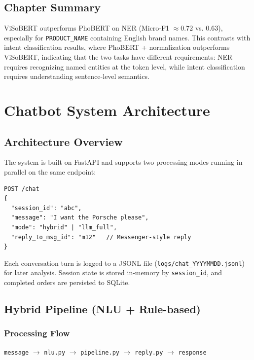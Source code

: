\documentclass[12pt, a4paper]{report}
\begin{document}
\section{Chapter Summary}

ViSoBERT outperforms PhoBERT on NER (Micro-F1 $\approx 0.72$ vs. $0.63$),
especially for \texttt{PRODUCT\_NAME} containing English brand names.
This contrasts with intent classification results, where PhoBERT + normalization
outperforms ViSoBERT, indicating that the two tasks have different requirements:
NER requires recognizing named entities at the token level,
while intent classification requires understanding sentence-level semantics.

\chapter{Chatbot System Architecture}

\section{Architecture Overview}

The system is built on FastAPI and supports two processing modes
running in parallel on the same endpoint:

\begin{lstlisting}[caption={Main API endpoint}]
POST /chat
{
  "session_id": "abc",
  "message": "I want the Porsche please",
  "mode": "hybrid" | "llm_full",
  "reply_to_msg_id": "m12"   // Messenger-style reply
}
\end{lstlisting}

Each conversation turn is logged to a JSONL file
(\texttt{logs/chat\_YYYYMMDD.jsonl}) for later analysis.
Session state is stored in-memory by \texttt{session\_id},
and completed orders are persisted to SQLite.

\section{Hybrid Pipeline (NLU + Rule-based)}

\subsection{Processing Flow}

\begin{center}
\texttt{message} $\rightarrow$ \texttt{nlu.py} $\rightarrow$
\texttt{pipeline.py} $\rightarrow$ \texttt{reply.py} $\rightarrow$ \texttt{response}
\end{center}
\end{document}
